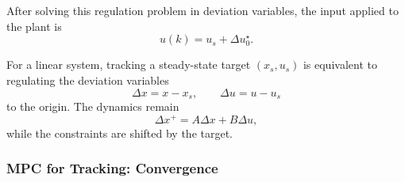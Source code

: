 After solving this regulation problem in deviation variables, the input applied to the plant is
\[
    u(k)=u_s+\Delta u_0^\star .
\]

\begin{theorembox}
For a linear system, tracking a steady-state target \((x_s,u_s)\) is equivalent to regulating the
deviation variables
\[
    \Delta x=x-x_s,\qquad \Delta u=u-u_s
\]
to the origin. The dynamics remain
\[
    \Delta x^+ = A\Delta x+B\Delta u,
\]
while the constraints are shifted by the target.
\end{theorembox}

\subsubsection{MPC for Tracking: Convergence}

